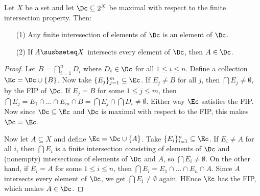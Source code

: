 \begin{lemma}\label{3.5.3}
    Let $X$ be a set and let  $\Dc \subseteq 2^X$ be maximal with respect to the finite intersection
    property. Then:
    \begin{enumerate}
        \item[(1)] Any finite interesection of elements of $\Dc$ is an element of  $\Dc$.

        \item [(2)] If $A \susbseteq X$ intersects every element of  $\Dc$, then  $A \in \Dc$.
    \end{enumerate}
\end{lemma}
\begin{proof}
    Let $B=\bigcap_{i=1}^n{D_i}$ where $D_i \in \Dc$ for all  $1 \leq i \leq n$. Define a collection
     $\Ec=\Dc \cup \{B\}$. Now take $\{E_j\}_{j=1}^m \subseteq \Ec$. If $E_j \neq B$ for all  $j$,
     then  $\bigcap{E_j} \neq \emptyset$, by the FIP of  $\Dc$. If  $E_j=B$ for some $1 \leq j \leq
     m$, then  $\bigcap{E_j}=E_1 \cap \dots \cap E_m \cap B=\bigcap{E_j} \cap \bigcap{D_i} \neq
     \emptyset$. Either way $\Ec$ satisfies the FIP. Now since  $\Dc \subseteq \Ec$ and  $\Dc$ is
     maximal with respect to the FIP, this makes  $\Dc=\Ec$.

     Now let  $A \subseteq X$ and define  $\Ec=\Dc \cup \{A\}$. Take $\{E_i\}_{i=1}^n \subseteq
     \Ec$. If $E_i \neq A$ for all $i$, then  $\bigcap{E_i}$ is a finite intersection consisting of
     elements of $\Dc$ and  (nonempty) intersections of elements of $\Dc$ and  $A$, so
     $\bigcap{E_i} \neq \emptyset$. On the other hand, if $E_i=A$ for some  $1 \leq i \leq n$, then
      $\bigcap{E_i}=E_1 \cap \dots \cap E_n \cap A$. Since $A$ intersects every element of  $\Dc$,
      we get  $\bigcap{E_i} \neq \emptyset$ again. HEnce $\Ec$ has the FIP, which makes  $A \in
      \Dc$.
\end{proof}

